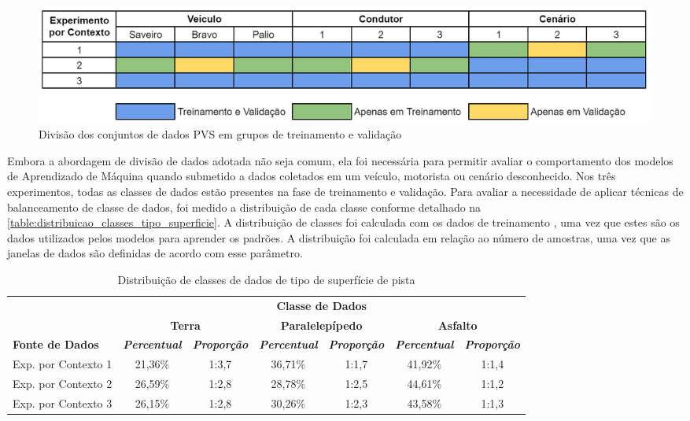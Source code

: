 \begin{figure}[h]
  \centering
  \caption{Divisão dos conjuntos de dados PVS em grupos de treinamento e validação}
  \label{fig:divisao_conjuntos_pvs}
  \includegraphics[width=1\textwidth]{figuras/fig_29.png}
\end{figure}

Embora a abordagem de divisão de dados adotada não seja comum, ela foi necessária para permitir avaliar o comportamento dos modelos de Aprendizado de Máquina quando submetido a dados coletados em um veículo, motorista ou cenário desconhecido. Nos três experimentos, todas as classes de dados estão presentes na fase de treinamento e validação. Para avaliar a necessidade de aplicar técnicas de balanceamento de classe de dados, foi medido a distribuição de cada classe conforme detalhado na \autoref{table:distribuicao_classes_tipo_superficie}. A distribuição de classes foi calculada com os dados de treinamento \cite{He2013,Kuhn2013}, uma vez que estes são os dados utilizados pelos modelos para aprender os padrões. A distribuição foi calculada em relação ao número de amostras, uma vez que as janelas de dados são definidas de acordo com esse parâmetro.

\begin{table}[h]
\caption{Distribuição de classes de dados de tipo de superfície de pista}
\label{table:distribuicao_classes_tipo_superficie}
\centering
\scriptsize
\begin{tabular}{lcccccc}
\cmidrule(l){2-7}
\multicolumn{1}{c}{\multirow{2}{*}{\textbf{}}} & 
\multicolumn{6}{c}{\textbf{Classe de Dados}} \\ \cmidrule(l){2-7} 
\multicolumn{1}{c}{} & 
\multicolumn{2}{c}{\textbf{Terra}} & 
\multicolumn{2}{c}{\textbf{Paralelepípedo}} & 
\multicolumn{2}{c}{\textbf{Asfalto}} \\ \midrule
\textbf{Fonte de Dados} & 
\textit{\textbf{Percentual}} & 
\textit{\textbf{Proporção}} & 
\textit{\textbf{Percentual}} & 
\textit{\textbf{Proporção}} & 
\textit{\textbf{Percentual}} & 
\textit{\textbf{Proporção}} \\ \midrule
Exp. por Contexto 1 & 21,36\% & 1:3,7 & 36,71\% & 1:1,7 & 41,92\% & 1:1,4 \\ \midrule
Exp. por Contexto 2 & 26,59\% & 1:2,8 & 28,78\% & 1:2,5 & 44,61\% & 1:1,2 \\ \midrule
Exp. por Contexto 3 & 26,15\% & 1:2,8 & 30,26\% & 1:2,3 & 43,58\% & 1:1,3 \\ \bottomrule
\end{tabular}
\end{table}

